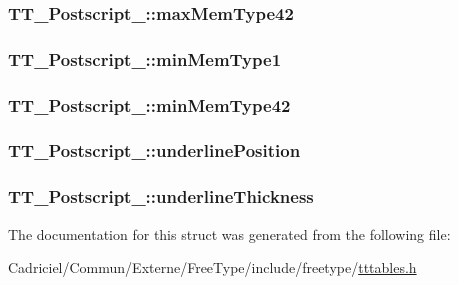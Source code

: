 \hypertarget{struct_t_t___postscript___a70c4ba372d04e686208f0fede9885314}{
\subsubsection[{max\-Mem\-Type42}]{ T\-T\-\_\-\-Postscript\-\_\-\-::max\-Mem\-Type42}}\label{struct_t_t___postscript___a70c4ba372d04e686208f0fede9885314}
\hypertarget{struct_t_t___postscript___a91a8b40f60e67a1920209e6b08355848}{
\subsubsection[{min\-Mem\-Type1}]{ T\-T\-\_\-\-Postscript\-\_\-\-::min\-Mem\-Type1}}\label{struct_t_t___postscript___a91a8b40f60e67a1920209e6b08355848}
\hypertarget{struct_t_t___postscript___ad78af4931654c197d4a8d0f04d473885}{
\subsubsection[{min\-Mem\-Type42}]{ T\-T\-\_\-\-Postscript\-\_\-\-::min\-Mem\-Type42}}\label{struct_t_t___postscript___ad78af4931654c197d4a8d0f04d473885}
\hypertarget{struct_t_t___postscript___a909fd5064ab7547bb8ed984b5dfe2fe2}{
\subsubsection[{underline\-Position}]{ T\-T\-\_\-\-Postscript\-\_\-\-::underline\-Position}}\label{struct_t_t___postscript___a909fd5064ab7547bb8ed984b5dfe2fe2}
\hypertarget{struct_t_t___postscript___a4e4654766a4f27054c9a35958515e186}{
\subsubsection[{underline\-Thickness}]{ T\-T\-\_\-\-Postscript\-\_\-\-::underline\-Thickness}}\label{struct_t_t___postscript___a4e4654766a4f27054c9a35958515e186}


The documentation for this struct was generated from the following file\-:\begin{DoxyCompactItemize}
\item 
Cadriciel/\-Commun/\-Externe/\-Free\-Type/include/freetype/\hyperlink{tttables_8h}{tttables.\-h}\end{DoxyCompactItemize}
